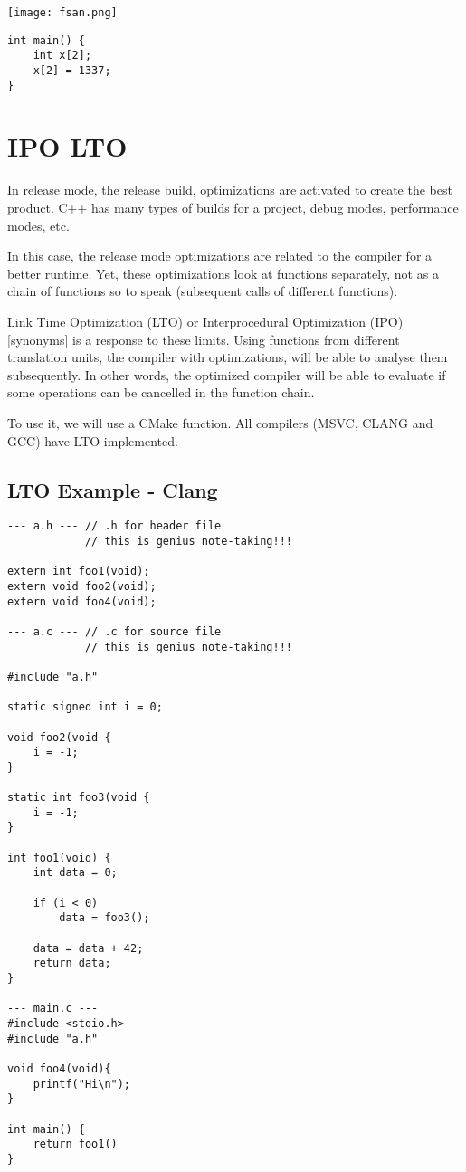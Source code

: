 \begin{center}
    \texttt{[image: fsan.png]}
\end{center}


\begin{verbatim}
int main() {
    int x[2];
    x[2] = 1337;
}
\end{verbatim}

\section{IPO LTO}

In release mode, the release build, optimizations are activated to create the best product. C++ has many types of builds
for a project, debug modes, performance modes, etc. 

In this case, the release mode optimizations are related to the compiler for a better runtime. Yet, these optimizations
look at functions separately, not as a chain of functions so to speak (subsequent calls of different functions).

Link Time Optimization (LTO) or Interprocedural Optimization (IPO) [synonyms] is a response to these limits. Using functions from different translation units, the compiler with optimizations,
will be able to analyse them subsequently. In other words, the optimized compiler will be able to evaluate
if some operations can be cancelled in the function chain.

To use it, we will use a CMake function. All compilers (MSVC, CLANG and GCC) have LTO implemented.


\subsection{LTO Example - Clang}

\begin{verbatim}
--- a.h --- // .h for header file
            // this is genius note-taking!!!

extern int foo1(void);
extern void foo2(void);
extern void foo4(void);

--- a.c --- // .c for source file
            // this is genius note-taking!!!

#include "a.h"

static signed int i = 0;

void foo2(void {
    i = -1; 
}

static int foo3(void {
    i = -1; 
}

int foo1(void) {
    int data = 0;

    if (i < 0)
        data = foo3();

    data = data + 42;
    return data;
}

--- main.c ---
#include <stdio.h>
#include "a.h"

void foo4(void){
    printf("Hi\n");
}

int main() {
    return foo1()
}
\end{verbatim}

